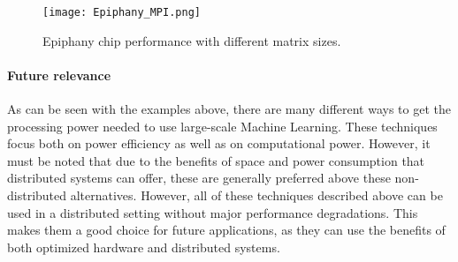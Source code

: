 \begin{figure}
  \texttt{[image: Epiphany\_MPI.png]}
  \caption{Epiphany chip performance with different matrix sizes\cite{Rich15}.}
  \label{Epiphany_MPI}
\end{figure}

\paragraph{Future relevance}
As can be seen with the examples above, there are many different ways to get the processing
power needed to use large-scale Machine Learning. These techniques focus both on
power efficiency as well as on computational power. However, it must be noted
that due to the benefits of space and power consumption that distributed systems can offer,
these are generally preferred above these non-distributed alternatives. However, all of these
techniques described above can be used in a distributed setting without major performance degradations.
This makes them a good choice for future applications, as they can use the benefits of both optimized hardware and distributed systems.
